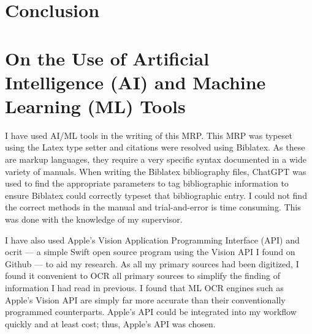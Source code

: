 \documentclass[noraggedright]{turabian-researchpaper}
\begin{document}




\section{Conclusion}

\newpage

\section{On the Use of Artificial Intelligence (AI) and Machine Learning 
(ML) Tools}

I have used AI/ML tools in the writing of this MRP.  This MRP was typeset
using the Latex type setter and citations were resolved using Biblatex.  As
these are markup languages, they require a very specific syntax documented in
a wide variety of manuals.  When writing the Biblatex bibliography files, 
ChatGPT was used to find the appropriate parameters to tag bibliographic 
information to ensure Biblatex could correctly typeset that bibliographic 
entry.  I could not find the correct methods in the manual and 
trial-and-error is time consuming.  This was done with the knowledge of my
supervisor.

I have also used Apple's Vision Application Programming Interface (API) and
ocrit --- a simple Swift open source program using the Vision API I found on 
Github --- to aid my research.  As all my primary sources had been digitized, 
I found it convenient to OCR all primary sources to simplify the finding of 
information I had read in previous.  I found that ML OCR engines such as 
Apple's Vision API are simply far more accurate than their conventionally
programmed counterparts.  Apple's API could be integrated into my workflow
quickly and at least cost; thus, Apple's API was chosen.
\end{document}
